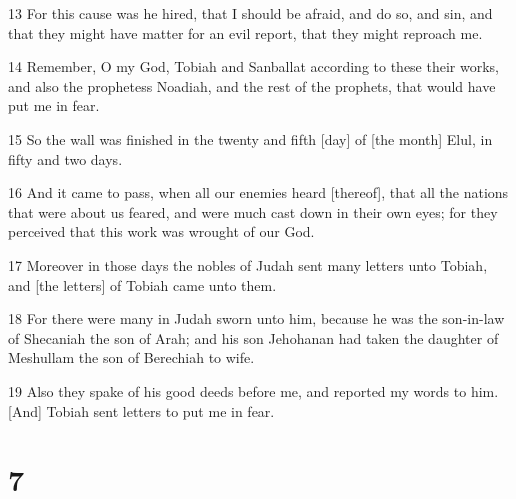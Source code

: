 \par 13 For this cause was he hired, that I should be afraid, and do so, and sin, and that they might have matter for an evil report, that they might reproach me.
\par 14 Remember, O my God, Tobiah and Sanballat according to these their works, and also the prophetess Noadiah, and the rest of the prophets, that would have put me in fear.
\par 15 So the wall was finished in the twenty and fifth [day] of [the month] Elul, in fifty and two days.
\par 16 And it came to pass, when all our enemies heard [thereof], that all the nations that were about us feared, and were much cast down in their own eyes; for they perceived that this work was wrought of our God.
\par 17 Moreover in those days the nobles of Judah sent many letters unto Tobiah, and [the letters] of Tobiah came unto them.
\par 18 For there were many in Judah sworn unto him, because he was the son-in-law of Shecaniah the son of Arah; and his son Jehohanan had taken the daughter of Meshullam the son of Berechiah to wife.
\par 19 Also they spake of his good deeds before me, and reported my words to him. [And] Tobiah sent letters to put me in fear.

\chapter{7}

